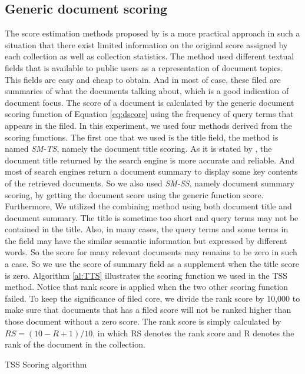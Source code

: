 \subsection{Generic document scoring}
The score estimation methods proposed by \cite{Rasolofo2003} is a more practical approach in such a situation that there exist limited information on the original score assigned by each collection as well as collection statistics. The method used different textual fields that is available to public users as a representation of document topics. This fields are easy and cheap to obtain. And in most of case, these filed are summaries of what the documents talking about, which is a good indication of document focus. The score of a document is calculated by the generic document scoring function of Equation \eqref{eq:dscore} using the frequency of query terms that appears in the filed. In this experiment, we used four methods derived from the scoring functions. The first one that we used is the title field, the method is named \textit{SM-TS}, namely the document title scoring. As it is stated by \cite{Rasolofo2003}, the document title returned by the search engine is more accurate and reliable. And most of search engines return a document summary to display some key contents of the retrieved documents. So we also used \textit{SM-SS}, namely document summary scoring, by getting the document score using the generic function score. Furthermore, We utilized the combining method using both document title and document summary. The title is sometime too short and query terms may not be contained in the title. Also, in many cases, the query terms and some terms in the field may have the similar semantic information but expressed by different words. So the score for many relevant documents may remains to be zero in such a case. So we use the score of summary field as a supplement when the title score is zero. Algorithm \ref{al:TTS} illustrates the scoring function we used in the TSS method. Notice that rank score is applied when the two other scoring function failed. To keep the significance of filed core, we divide the rank score by 10,000 to make sure that documents that has a filed score will not be ranked higher than those document without a zero score. The rank score is simply calculated by $RS=(10-R+1)/10$, in which RS denotes the rank score and R denotes the rank of the document in the collection.  

\begin{algorithm}
\caption{TSS Scoring algorithm}
\label{al:TTS}
\begin{algorithmic}
	\EndIf
\EndIf
\end{algorithmic}
\end{algorithm}



